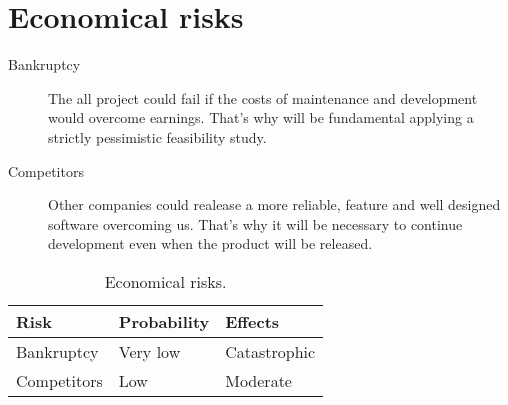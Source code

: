 \section{Economical risks}


\begin{description}
    \item[Bankruptcy] The all project could fail if the costs of maintenance and development would overcome earnings.
    That's why will be fundamental applying a strictly pessimistic feasibility study.

    \item[Competitors] Other companies could realease a more reliable, feature and well designed software overcoming us. That's why it will be necessary to continue development even when the product will be released.
\end{description}

\begin{table}[p]
\centering
    \begin{tabular}{| l | l | l |}
        \hline
        \textbf{Risk}       & \textbf{Probability}  & \textbf{Effects}  \\
        \hline
        Bankruptcy          & Very low             & Catastrophic      \\
        \hline
        Competitors         & Low              & Moderate            \\
        \hline
    \end{tabular}
    \caption{Economical risks.}
    \label{tab:economical-risks}
\end{table}